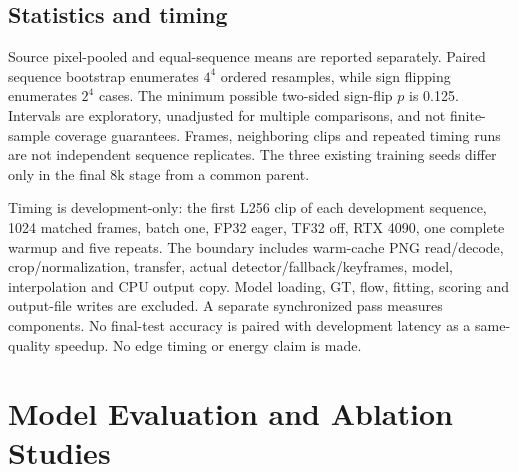 \documentclass[mathematics,article,submit,moreauthors]{Definitions/mdpi}
\begin{document}
\subsection{Statistics and timing}
Source pixel-pooled and equal-sequence means are reported separately. Paired sequence
bootstrap enumerates $4^4$ ordered resamples, while sign flipping enumerates $2^4$ cases.
The minimum possible two-sided sign-flip $p$ is 0.125. Intervals are exploratory,
unadjusted for multiple comparisons, and not finite-sample coverage guarantees.
Frames, neighboring clips and repeated timing runs are not independent sequence replicates.
The three existing training seeds differ only in the final 8k stage from a common parent.

Timing is development-only: the first L256 clip of each development sequence, 1024 matched
frames, batch one, FP32 eager, TF32 off, RTX 4090, one complete warmup and five repeats.
The boundary includes warm-cache PNG read/decode, crop/normalization, transfer, actual
detector/fallback/keyframes, model, interpolation and CPU output copy. Model loading,
GT, flow, fitting, scoring and output-file writes are excluded. A separate synchronized
pass measures components. No final-test accuracy is paired with development latency
as a same-quality speedup. No edge timing or energy claim is made.

\section{Model Evaluation and Ablation Studies}

\end{document}
